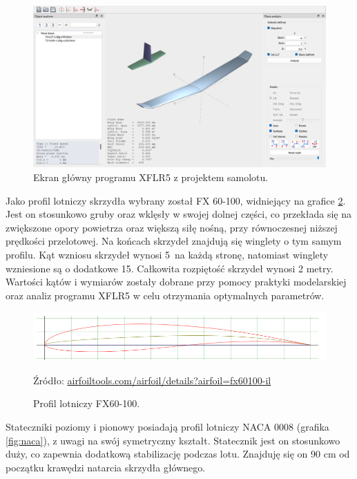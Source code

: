 \documentclass[12pt, a4paper]{article}
\begin{document}
 \begin{figure}[ht]
    \centering
    \includegraphics[width=1\textwidth]{xflr}
    \caption{Ekran główny programu XFLR5 z projektem samolotu.}
    \label{fig:xflr}
\end{figure}

Jako profil lotniczy skrzydła wybrany został FX 60-100, widniejący na grafice \ref{fig:fx60}. Jest on stosunkowo gruby oraz wklęsły w swojej dolnej części, co przekłada się na zwiększone opory powietrza oraz większą siłę nośną, przy równoczesnej niższej prędkości przelotowej. Na końcach skrzydeł znajdują się winglety o tym samym profilu. Kąt wzniosu skrzydeł wynosi 5\textdegree\ na każdą stronę, natomiast winglety wzniesione są o dodatkowe 15\textdegree. Całkowita rozpiętość skrzydeł wynosi 2 metry. Wartości kątów i wymiarów zostały dobrane przy pomocy praktyki modelarskiej oraz analiz programu XFLR5 w celu otrzymania optymalnych parametrów.

 \begin{figure}[ht]
    \centering
    \includegraphics[width=1\textwidth]{fx60}
    \caption{Profil lotniczy FX60-100.}
    \small Źródło: \url{airfoiltools.com/airfoil/details?airfoil=fx60100-il}
    \label{fig:fx60}
\end{figure}

Stateczniki poziomy i pionowy posiadają profil lotniczy NACA 0008 (grafika \ref{fig:naca}), z uwagi na swój symetryczny kształt. Statecznik jest on stosunkowo duży, co zapewnia dodatkową stabilizację podczas lotu. Znajduję się on 90 cm od początku krawędzi natarcia skrzydła głównego.
\end{document}
